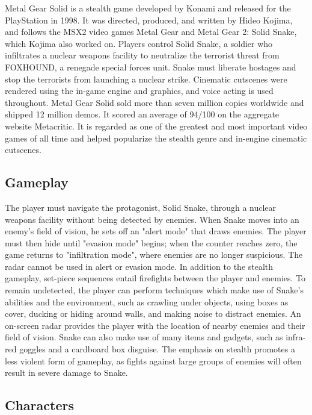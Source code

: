 \documentclass[a4paper,10pt]{book}
\begin{document}
          Metal Gear Solid is a stealth game developed by Konami and released for the PlayStation in 1998. It was directed, produced, and written by Hideo Kojima, and follows the MSX2 video games Metal Gear and Metal Gear 2: Solid Snake, which Kojima also worked on. 
          Players control Solid Snake, a soldier who infiltrates a nuclear weapons facility to neutralize the terrorist threat from FOXHOUND, a renegade special forces unit. Snake must liberate hostages and stop the terrorists from launching a nuclear strike. Cinematic cutscenes were rendered using the in-game engine and graphics, and voice acting is used throughout. 
          Metal Gear Solid sold more than seven million copies worldwide and shipped 12 million demos. It scored an average of 94/100 on the aggregate website Metacritic. It is regarded as one of the greatest and most important video games of all time and helped popularize the stealth genre and in-engine cinematic cutscenes.
         
 \subsection{Gameplay }
 
          The player must navigate the protagonist, Solid Snake, through a nuclear weapons facility without being detected by enemies. When Snake moves into an enemy's field of vision, he sets off an "alert mode" that draws enemies. The player must then hide until "evasion mode" begins; when the counter reaches zero, the game returns to "infiltration mode", where enemies are no longer suspicious. The radar cannot be used in alert or evasion mode. In addition to the stealth gameplay, set-piece sequences entail firefights between the player and enemies.  
          To remain undetected, the player can perform techniques which make use of Snake's abilities and the environment, such as crawling under objects, using boxes as cover, ducking or hiding around walls, and making noise to distract enemies. An on-screen radar provides the player with the location of nearby enemies and their field of vision. 
          Snake can also make use of many items and gadgets, such as infra-red goggles and a cardboard box disguise. The emphasis on stealth promotes a less violent form of gameplay, as fights against large groups of enemies will often result in severe damage to Snake.
         
 \subsection{Characters }
 
\end{document}
